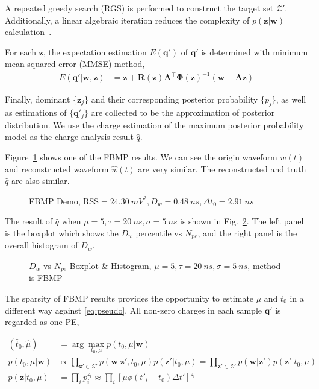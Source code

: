 A repeated greedy search (RGS) is performed to construct the target set $\mathcal{Z}'$. Additionally, a linear algebraic iteration reduces the complexity of $p(\bm{z}|\bm{w})$ calculation~\cite{schniter_fast_nodate}. 

For each $\bm{z}$, the expectation estimation $E(\bm{q}')$ of $\bm{q}'$ is determined with minimum mean squared error (MMSE) method, 
\begin{align}
    E(\bm{q}'|\bm{w},\bm{z}) &= \bm{z} + \bm{R}(\bm{z})\bm{A}^\top\bm{\Phi}(\bm{z})^{-1}(\bm{w}-\bm{A}\bm{z})
\end{align}

Finally, dominant $\{\bm{z}_j\}$ and their corresponding posterior probability $\{p_j\}$, as well as estimations of $\{\bm{q}'_j\}$ are collected to be the approximation of posterior distribution. We use the charge estimation of the maximum posterior probability model as the charge analysis result $\hat{q}$. 

Figure~\ref{fig:fbmp} shows one of the FBMP results. We can see the origin waveform $w(t)$ and reconstructed waveform $\hat{w}(t)$ are very similar. The reconstructed and truth $\hat{q}$ are also similar. 

\begin{figure}[H]
    \centering
    \scalebox{0.4}{}
    \caption{\label{fig:fbmp} FBMP Demo, $\mathrm{RSS}=\SI{24.30}{mV^2},D_w=\SI{0.48}{ns},\Delta{t_0}=\SI{2.91}{ns}$}
\end{figure}

The result of $\hat{q}$ when $\mu=5, \tau=\SI{20}{ns}, \sigma=\SI{5}{ns}$ is shown in Fig.~\ref{fig:fbmp-npe}. The left panel is the boxplot which shows the $D_w$ percentile vs $N_{pe}$, and the right panel is the overall histogram of $D_w$. 

\begin{figure}[H]
    \centering
    \resizebox{0.5\textwidth}{!}{}
    \caption{\label{fig:fbmp-npe} $D_w$ vs $N_{pe}$ Boxplot \& Histogram, $\mu=5, \tau=\SI{20}{ns}, \sigma=\SI{5}{ns}$, method is FBMP}
\end{figure}

The sparsity of FBMP results provides the opportunity to estimate $\mu$ and $t_0$ in a different way against \eqref{eq:pseudo}. All non-zero charges in each sample $\bm{q}'$ is regarded as one PE, 

\begin{equation}
\begin{aligned}
    \left(\hat{t}_0, \hat{\mu}\right) &= \arg\underset{t_0,\mu}{\max} p(t_0, \mu|\bm{w}) \\
    p(t_0, \mu|\bm{w}) &\propto \prod_{\bm{z}'\in\mathcal{Z}'}p(\bm{w}|\bm{z}',t_0,\mu)p(\bm{z}'|t_0,\mu) = \prod_{\bm{z}'\in\mathcal{Z}'}p(\bm{w}|\bm{z}')p(\bm{z}'|t_0,\mu) \\
    p(\bm{z}|t_0,\mu) &= \prod_{i}p_i^{z_i} \approx \prod_{i}\left[\mu\phi(t'_i - t_0)\Delta{t'}\right]^{z_i}
\end{aligned}
\end{equation}

